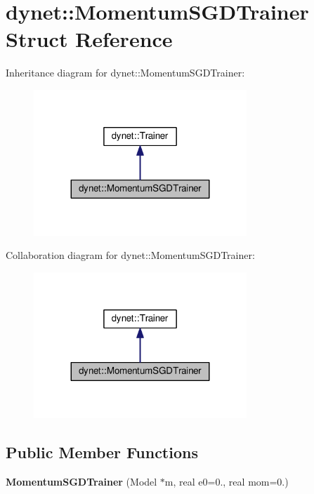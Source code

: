 \hypertarget{structdynet_1_1MomentumSGDTrainer}{}\section{dynet\+:\+:Momentum\+S\+G\+D\+Trainer Struct Reference}
\label{structdynet_1_1MomentumSGDTrainer}


Inheritance diagram for dynet\+:\+:Momentum\+S\+G\+D\+Trainer\+:\nopagebreak
\begin{figure}[H]
\begin{center}
\leavevmode
\includegraphics[width=227pt]{structdynet_1_1MomentumSGDTrainer__inherit__graph}
\end{center}
\end{figure}


Collaboration diagram for dynet\+:\+:Momentum\+S\+G\+D\+Trainer\+:\nopagebreak
\begin{figure}[H]
\begin{center}
\leavevmode
\includegraphics[width=227pt]{structdynet_1_1MomentumSGDTrainer__coll__graph}
\end{center}
\end{figure}
\subsection*{Public Member Functions}
\begin{DoxyCompactItemize}
\item 
\hypertarget{structdynet_1_1MomentumSGDTrainer_a29ba25e1ad153bc552edc178a69c67c7}{}{\bfseries Momentum\+S\+G\+D\+Trainer} (Model $\ast$m, real e0=0., real mom=0.)\label{structdynet_1_1MomentumSGDTrainer_a29ba25e1ad153bc552edc178a69c67c7}

\end{DoxyCompactItemize}
